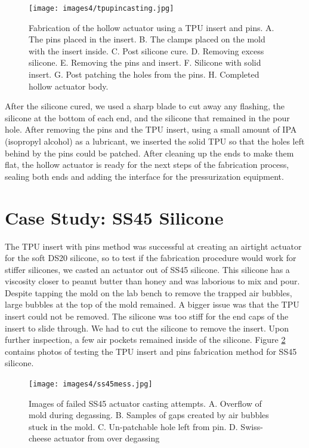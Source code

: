 \begin{figure}[h]
    \centering
    \texttt{[image: images4/tpupincasting.jpg]}
    \caption{Fabrication of the hollow actuator using a TPU insert and pins. A. The pins placed in the insert. B. The clamps placed on the mold with the insert inside. C. Post silicone cure. D. Removing excess silicone. E. Removing the pins and insert. F. Silicone with solid insert. G. Post patching the holes from the pins. H. Completed hollow actuator body.}
    \label{fig:tpupinfab}
\end{figure}

After the silicone cured, we used a sharp blade to cut away any flashing, the silicone at the bottom of each end, and the silicone that remained in the pour hole. After removing the pins and the TPU insert, using a small amount of IPA (isopropyl alcohol) as a lubricant, we inserted the solid TPU so that the holes left behind by the pins could be patched. After cleaning up the ends to make them flat, the hollow actuator is ready for the next steps of the fabrication process, sealing both ends and adding the interface for the pressurization equipment. 

\section{Case Study: SS45 Silicone}

The TPU insert with pins method was successful at creating an airtight actuator for the soft DS20 silicone, so to test if the fabrication procedure would work for stiffer silicones, we casted an actuator out of SS45 silicone. This silicone has a viscosity closer to peanut butter than honey and was laborious to mix and pour. Despite tapping the mold on the lab bench to remove the trapped air bubbles, large bubbles at the top of the mold remained. A bigger issue was that the TPU insert could not be removed. The silicone was too stiff for the end caps of the insert to slide through. We had to cut the silicone to remove the insert. Upon further inspection, a few air pockets remained inside of the silicone. Figure \ref{fig:ss45mess} contains photos of testing the TPU insert and pins fabrication method for SS45 silicone. 

\begin{figure}[h]
    \centering
    \texttt{[image: images4/ss45mess.jpg]}
    \caption{Images of failed SS45 actuator casting attempts. A. Overflow of mold during degassing. B. Samples of gaps created by air bubbles stuck in the mold. C. Un-patchable hole left from pin. D. Swiss-cheese actuator from over degassing}
    \label{fig:ss45mess}
\end{figure}


